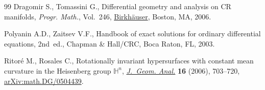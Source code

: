 \documentclass[pdftex]{sigma}
\numberwithin{equation}{section}
\begin{document}
\begin{thebibliography}{99}
Dragomir S., Tomassini G., Differential geometry and analysis on {CR}
 manifolds, \textit{Progr. Math.}, Vol.~246, \href{https://doi.org/10.1007/0-8176-4483-0}{Birkh\"auser}, Boston, MA, 2006.

Polyanin A.D., Zaitsev V.F., Handbook of exact solutions for ordinary
 differential equations, 2nd~ed., Chapman \& Hall/CRC, Boca Raton, FL, 2003.

Ritor\'e M., Rosales C., Rotationally invariant hypersurfaces with constant
 mean curvature in the {H}eisenberg group {$\mathbb H^n$}, \href{https://doi.org/10.1007/BF02922137}{\textit{J.~Geom.
 Anal.}} \textbf{16} (2006), 703--720, \href{https://arxiv.org/abs/math.DG/0504439}{arXiv:math.DG/0504439}.

\end{thebibliography}\LastPageEnding
\end{document}
